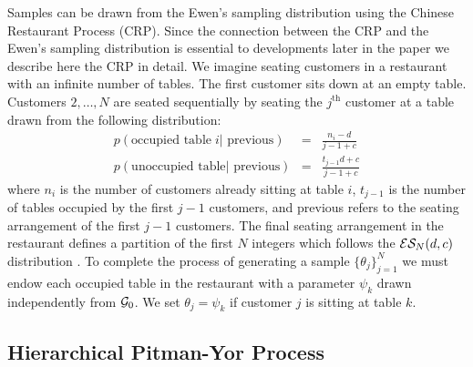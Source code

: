 Samples can be drawn from the Ewen's sampling distribution using the Chinese Restaurant Process (CRP).  Since the connection between the CRP and the Ewen's sampling distribution is essential to developments later in the paper we describe here the CRP in detail. We imagine seating customers in a restaurant with an infinite number of tables. The first customer sits down at an empty table.  Customers $2, \dots ,N$ are seated sequentially by seating the $j^{\mathrm{th}}$ customer at a table drawn from the following distribution:
%
\[
\begin{array}{lcl}
p(\textrm{occupied table}\; i |\textrm{ previous}) &=& \frac{n_i - d}{j-1+ c}\\
p(\textrm{unoccupied table} | \textrm{ previous}) &=& \frac{t_{j-1}d +c}{j-1+c}
\end{array}
\]
%
where $n_i$ is the number of customers already sitting at table $i$, $t_{j-1}$ is the number of tables occupied by the first $j-1$ customers, and previous refers to the seating arrangement of the first $j-1$ customers.  The final seating arrangement in the restaurant defines a partition of the first $N$ integers which follows the $\ES_N(d,c)$ distribution \cite{Pitman1995}.  To complete the process of generating a sample $\{ \theta_j \}_{j = 1}^N$ we must endow each occupied table in the restaurant with a parameter $\psi_k$ drawn independently from $\G_0$.  We set $\theta_j = \psi_k$ if customer $j$ is sitting at table $k$.


\subsection{Hierarchical Pitman-Yor Process}

